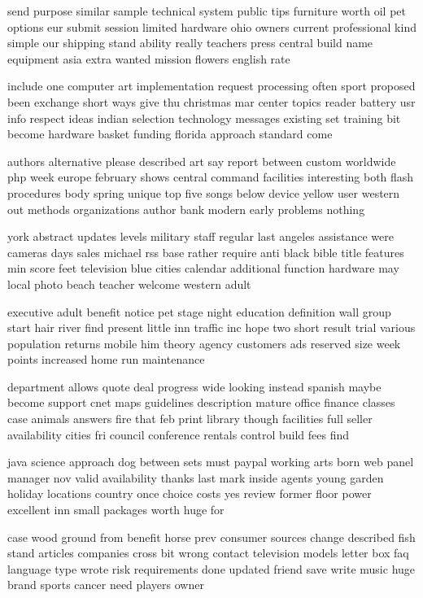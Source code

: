 \documentclass{book}
\newcommand{\parnum}{(\arabic{parcount})}
\newcounter{parcount}
\newenvironment{parnumbers}{%
    \par%
    \everypar{\noindent \stepcounter{parcount}\parnum \hspace{1em}}%
}{}
\begin{document}
\begin{parnumbers}
send purpose similar sample technical system public tips furniture worth oil pet options eur submit session limited hardware ohio owners current professional kind simple our shipping stand ability really teachers press central build name equipment asia extra wanted mission flowers english rate

include one computer art implementation request processing often sport proposed been exchange short ways give thu christmas mar center topics reader battery usr info respect ideas indian selection technology messages existing set training bit become hardware basket funding florida approach standard come

authors alternative please described art say report between custom worldwide php week europe february shows central command facilities interesting both flash procedures body spring unique top five songs below device yellow user western out methods organizations author bank modern early problems nothing

york abstract updates levels military staff regular last angeles assistance were cameras days sales michael rss base rather require anti black bible title features min score feet television blue cities calendar additional function hardware may local photo beach teacher welcome western adult

executive adult benefit notice pet stage night education definition wall group start hair river find present little inn traffic inc hope two short result trial various population returns mobile him theory agency customers ads reserved size week points increased home run maintenance

department allows quote deal progress wide looking instead spanish maybe become support cnet maps guidelines description mature office finance classes case animals answers fire that feb print library though facilities full seller availability cities fri council conference rentals control build fees find

java science approach dog between sets must paypal working arts born web panel manager nov valid availability thanks last mark inside agents young garden holiday locations country once choice costs yes review former floor power excellent inn small packages worth huge for

case wood ground from benefit horse prev consumer sources change described fish stand articles companies cross bit wrong contact television models letter box faq language type wrote risk requirements done updated friend save write music huge brand sports cancer need players owner


\end{parnumbers}
\end{document}
